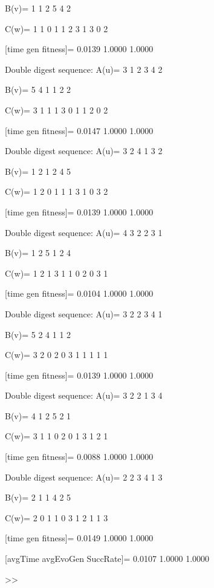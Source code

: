 B(v)=
     1     1     2     5     4     2

C(w)=
     1     1     0     1     1     2     3     1     3     0     2

[time gen fitness]=
    0.0139    1.0000    1.0000

Double digest sequence:
A(u)=
     3     1     2     3     4     2

B(v)=
     5     4     1     1     2     2

C(w)=
     3     1     1     1     3     0     1     1     2     0     2

[time gen fitness]=
    0.0147    1.0000    1.0000

Double digest sequence:
A(u)=
     3     2     4     1     3     2

B(v)=
     1     2     1     2     4     5

C(w)=
     1     2     0     1     1     1     3     1     0     3     2

[time gen fitness]=
    0.0139    1.0000    1.0000

Double digest sequence:
A(u)=
     4     3     2     2     3     1

B(v)=
     1     2     5     1     2     4

C(w)=
     1     2     1     3     1     1     0     2     0     3     1

[time gen fitness]=
    0.0104    1.0000    1.0000

Double digest sequence:
A(u)=
     3     2     2     3     4     1

B(v)=
     5     2     4     1     1     2

C(w)=
     3     2     0     2     0     3     1     1     1     1     1

[time gen fitness]=
    0.0139    1.0000    1.0000

Double digest sequence:
A(u)=
     3     2     2     1     3     4

B(v)=
     4     1     2     5     2     1

C(w)=
     3     1     1     0     2     0     1     3     1     2     1

[time gen fitness]=
    0.0088    1.0000    1.0000

Double digest sequence:
A(u)=
     2     2     3     4     1     3

B(v)=
     2     1     1     4     2     5

C(w)=
     2     0     1     1     0     3     1     2     1     1     3

[time gen fitness]=
    0.0149    1.0000    1.0000

[avgTime  avgEvoGen  SuccRate]=
    0.0107    1.0000    1.0000

>> 